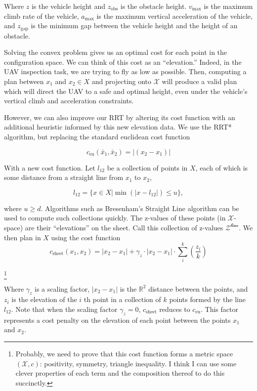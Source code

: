 \documentclass[letterpaper, 10 pt, conference]{ieeeconf}
\begin{document}
Where $z$ is the vehicle height and $z_\text{obs}$ is the obstacle height. $v_\text{max}$ is the maximum climb rate of the vehicle, $a_\text{max}$ is the maximum vertical acceleration of the vehicle, and $z_\text{gap}$ is the minimum gap between the vehicle height and the height of an obstacle.

Solving the convex problem gives us an optimal cost for each point in the configuration space. We can think of this cost as an ``elevation.'' Indeed, in the UAV inspection task, we are trying to fly as low as possible. Then, computing a plan between $x_1$ and $x_2 \in X$ and projecting onto $\mathcal{X}$ will produce a valid plan which will direct the UAV to a safe and optimal height, even under the vehicle's vertical climb and acceleration constraints.


However, we can also improve our RRT by altering its cost function with an additional heuristic informed by this new elevation data. We use the RRT* algorithm, but replacing the standard euclidean cost function

\begin{equation}
c_\text{eu}(\bar{x}_1, \bar{x}_2) = |(x_2 - x_1)|
\end{equation}


With a new cost function. Let $l_{12}$ be a collection of points in $X$, each of which is some distance from a straight line from $x_1$ to $x_2$,

\begin{equation}
l_{12} = \{x \in X | \min(|x - l_{12}|) \leq u \},
\end{equation}

where $u \geq d$. Algorithms such as Bresenham's Straight Line algorithm can be used to compute such collections quickly. The z-values of these points (in $\mathcal{X}$-space) are their ``elevations'' on the sheet. Call this collection of z-values $\mathcal{Z^\text{line}}$. We then plan in $X$ using the cost function
\begin{equation}
c_\text{sheet}(x_1, x_2) = |x_2 - x_1| + \gamma_z \cdot |x_2 - x_1| \cdot \sum^k_i({\frac{z_i}{k}})
\end{equation}

\footnote{
Probably, we need to prove that this cost function forms a metric space $(\mathcal{X}, c)$: positivity, symmetry,  triangle inequality. I think I can use some clever properties of each term and the composition thereof to do this succinctly.}




Where $\gamma_z$ is a scaling factor, $|x_2-x_1|$ is the $\mathbb{R}^2$ distance between the points, and $z_i$ is the elevation of the $i$ th point in a collection of $k$ points formed by the line $l_{12}$. Note that when the scaling factor $\gamma_z=0$, $c_\text{sheet}$ reduces to $c_\text{eu}$. This factor represents a cost penalty on the elevation of each point between the points $x_1$ and $x_2$. 
\end{document}

